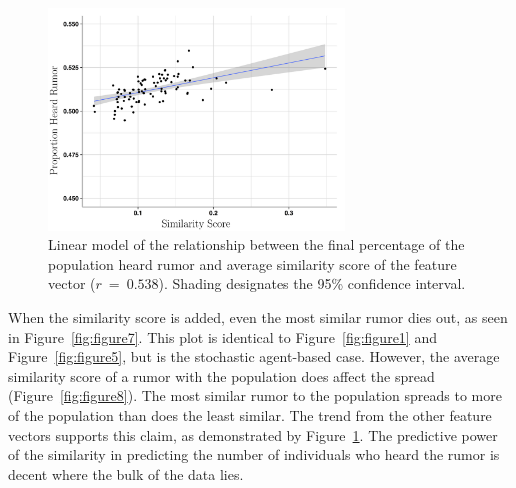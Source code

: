 \begin{figure}[H]
\captionsetup{width=0.8\textwidth}
\centering
    \includegraphics[width=0.7\textwidth]{figures/figure9}
  \caption{ Linear model of the relationship between the final percentage of the population heard rumor and average similarity score of the feature vector ($ r~=~0.538 $).
Shading designates the 95\% confidence interval.}
\label{fig:figure9}
\end{figure}

When the similarity score is added, even the most similar rumor dies out, as seen in Figure~\ref{fig:figure7}.
This plot is identical to Figure~\ref{fig:figure1} and Figure~\ref{fig:figure5}, but is the stochastic agent-based case.
However, the average similarity score of a rumor with the population does affect the spread (Figure~\ref{fig:figure8}).
The most similar rumor to the population spreads to more of the population than does the least similar.
The trend from the other feature vectors supports this claim, as demonstrated by Figure~\ref{fig:figure9}.
The predictive power of the similarity in predicting the number of individuals who heard the rumor is decent where the bulk of the data lies.
